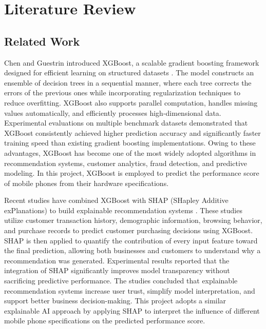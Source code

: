 \documentclass[12pt, a4paper]{report}
\numberwithin{figure}{chapter}
\numberwithin{table}{chapter}
\numberwithin{equation}{chapter}
\begin{document}
\chapter{Literature Review}



\section{Related Work}
Chen and Guestrin introduced XGBoost, a scalable gradient boosting framework designed for efficient learning on structured datasets \cite{chen}. The model constructs an ensemble of decision trees in a sequential manner, where each tree corrects the errors of the previous ones while incorporating regularization techniques to reduce overfitting. XGBoost also supports parallel computation, handles missing values automatically, and efficiently processes high-dimensional data. Experimental evaluations on multiple benchmark datasets demonstrated that XGBoost consistently achieved higher prediction accuracy and significantly faster training speed than existing gradient boosting implementations. Owing to these advantages, XGBoost has become one of the most widely adopted algorithms in recommendation systems, customer analytics, fraud detection, and predictive modeling. In this project, XGBoost is employed to predict the performance score of mobile phones from their hardware specifications.

Recent studies have combined XGBoost with SHAP (SHapley Additive exPlanations) to build explainable recommendation systems \cite{crosssell}. These studies utilize customer transaction history, demographic information, browsing behavior, and purchase records to predict customer purchasing decisions using XGBoost. SHAP is then applied to quantify the contribution of every input feature toward the final prediction, allowing both businesses and customers to understand why a recommendation was generated. Experimental results reported that the integration of SHAP significantly improves model transparency without sacrificing predictive performance. The studies concluded that explainable recommendation systems increase user trust, simplify model interpretation, and support better business decision-making. This project adopts a similar explainable AI approach by applying SHAP to interpret the influence of different mobile phone specifications on the predicted performance score.
\end{document}
